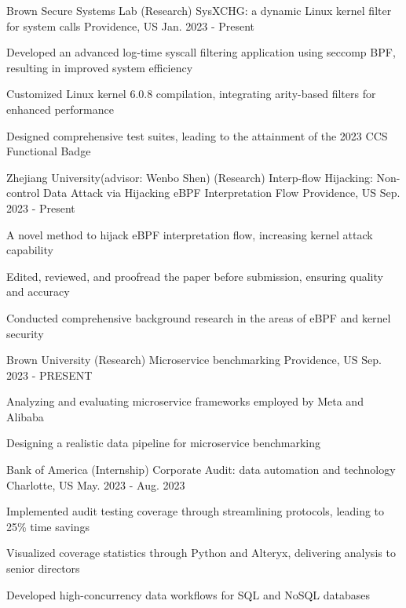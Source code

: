 \begin{cventries}

  \cventry
    {Brown Secure Systems Lab}
    {(Research) SysXCHG: a dynamic Linux kernel filter for system calls}
    {Providence, US}
    {Jan. 2023 - Present}
    {
      \begin{cvitems}
        \item {Developed an advanced log-time syscall filtering application using seccomp BPF, resulting in improved system efficiency}
        \item {Customized Linux kernel 6.0.8 compilation, integrating arity-based filters for enhanced performance}
        \item {Designed comprehensive test suites, leading to the attainment of the 2023 CCS Functional Badge}
      \end{cvitems}
    }
  
  \cventry
    {Zhejiang University(advisor: Wenbo Shen)}
    {(Research) Interp-flow Hijacking: Non-control Data Attack via Hijacking eBPF Interpretation Flow} 
    {Providence, US}
    {Sep. 2023 - Present}
    {
      \begin{cvitems}
        \item {A novel method to hijack eBPF interpretation flow, increasing kernel attack capability}
        \item {Edited, reviewed, and proofread the paper before submission, ensuring quality and accuracy}
        \item {Conducted comprehensive background research in the areas of eBPF and kernel security}
      \end{cvitems}
    }


  \cventry
    {Brown University}
    {(Research) Microservice benchmarking}
    {Providence, US}
    {Sep. 2023 - PRESENT}
    {
      \begin{cvitems}
        \item {Analyzing and evaluating microservice frameworks employed by Meta and Alibaba}
        \item {Designing a realistic data pipeline for microservice benchmarking}
      \end{cvitems}
    }

  \cventry
    {Bank of America}
    {(Internship) Corporate Audit: data automation and technology}
    {Charlotte, US}
    {May. 2023 - Aug. 2023}
    {
      \begin{cvitems}
        \item {Implemented audit testing coverage through streamlining protocols, leading to 25\% time savings}
        \item {Visualized coverage statistics through Python and Alteryx, delivering analysis to senior directors}
        \item {Developed high-concurrency data workflows for SQL and NoSQL databases}
      \end{cvitems}
    }


\end{cventries}
